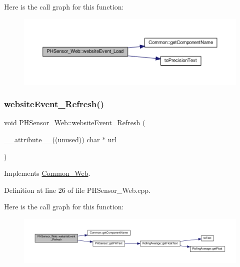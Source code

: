 Here is the call graph for this function\+:
\nopagebreak
\begin{figure}[H]
\begin{center}
\leavevmode
\includegraphics[width=350pt]{class_p_h_sensor___web_ad986c8800153e737e43fab3bd155b8af_cgraph}
\end{center}
\end{figure}
\mbox{\label{class_p_h_sensor___web_a73ad3c5be0e9dd8deaea4cf2eee654be}} 
\subsubsection{\texorpdfstring{website\+Event\+\_\+\+Refresh()}{websiteEvent\_Refresh()}}
{\footnotesize\ttfamily void P\+H\+Sensor\+\_\+\+Web\+::website\+Event\+\_\+\+Refresh (\begin{DoxyParamCaption}\item[{\+\_\+\+\_\+attribute\+\_\+\+\_\+((unused)) char $\ast$}]{url }\end{DoxyParamCaption})\hspace{0.3cm}{\ttfamily [virtual]}}



Implements \hyperlink{class_common___web_aaca7c54fdcf908e4e1256b7b1f6fc212}{Common\+\_\+\+Web}.



Definition at line 26 of file P\+H\+Sensor\+\_\+\+Web.\+cpp.

Here is the call graph for this function\+:
\nopagebreak
\begin{figure}[H]
\begin{center}
\leavevmode
\includegraphics[width=350pt]{class_p_h_sensor___web_a73ad3c5be0e9dd8deaea4cf2eee654be_cgraph}
\end{center}
\end{figure}


